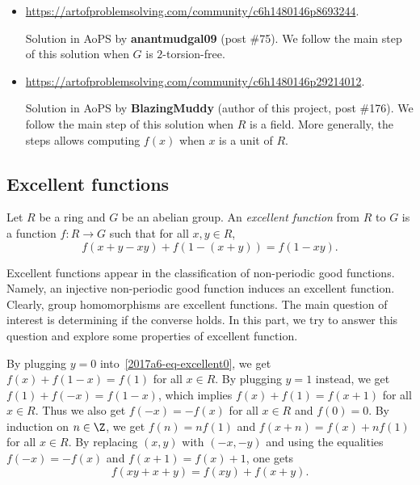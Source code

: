 \begin{itemize}
    
    \item
    \url{https://artofproblemsolving.com/community/c6h1480146p8693244}.
    
    Solution in AoPS by \textbf{anantmudgal09} (post \#75).
    We follow the main step of this solution when $G$ is $2$-torsion-free.

    \item
    \url{https://artofproblemsolving.com/community/c6h1480146p29214012}.

    Solution in AoPS by \textbf{BlazingMuddy} (author of this project, post \#176).
    We follow the main step of this solution when $R$ is a field.
    More generally, the steps allows computing $f(x)$ when $x$ is a unit of $R$.

\end{itemize}





\subsection*{Excellent functions}

Let $R$ be a ring and $G$ be an abelian group.
An \emph{excellent function} from $R$ to $G$ is a function $f : R \to G$ such that for all $x, y \in R$,
\[ f(x + y - xy) + f(1 - (x + y)) = f(1 - xy). \tag{**}\label{2017a6-eq-excellent0} \]

Excellent functions appear in the classification of non-periodic good functions.
Namely, an injective non-periodic good function induces an excellent function.
Clearly, group homomorphisms are excellent functions.
The main question of interest is determining if the converse holds.
In this part, we try to answer this question and explore some properties of excellent function.

By plugging $y = 0$ into~\eqref{2017a6-eq-excellent0}, we get $f(x) + f(1 - x) = f(1)$ for all $x \in R$.
By plugging $y = 1$ instead, we get $f(1) + f(-x) = f(1 - x)$, which implies $f(x) + f(1) = f(x + 1)$ for all $x \in R$.
Thus we also get $f(-x) = -f(x)$ for all $x \in R$ and $f(0) = 0$.
By induction on $n \in \Z$, we get $f(n) = n f(1)$ and $f(x + n) = f(x) + n f(1)$ for all $x \in R$.
By replacing $(x, y)$ with $(-x, -y)$ and using the equalities $f(-x) = -f(x)$ and $f(x + 1) = f(x) + 1$, one gets
\[ f(xy + x + y) = f(xy) + f(x + y). \tag{3.1}\label{2017a6-eq-excellent1} \]

